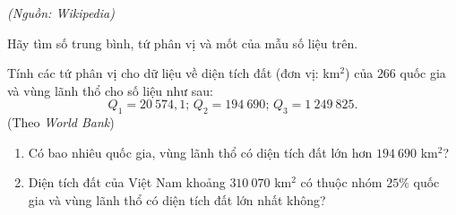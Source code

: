 \begin{bt}
\begin{center}
\begin{tabular}{|c|c|c|c|c|c|c|c|c|c|}
			\hline
		\end{tabular}
	\end{center}
	\begin{flushright}
		\textit{(Nguồn: Wikipedia)}
	\end{flushright}
Hãy tìm số trung bình, tứ phân vị và mốt của mẫu số liệu trên.
\end{bt}

\begin{bt}%
	Tính các tứ phân vị cho dữ liệu về diện tích đất (đơn vị: km$^2$) của $266$ quốc gia và vùng lãnh thổ cho số liệu như sau:
	\[ Q_1=20\ 574{,}1;\, Q_2=194\ 690;\, Q_3=1\ 249\ 825.\]
	\hfill (Theo \textit{World Bank})
	\begin{enumerate}
		\item Có bao nhiêu quốc gia, vùng lãnh thổ có diện tích đất lớn hơn $194\ 690$ km$^2$?
		\item Diện tích đất của Việt Nam khoảng $310\ 070$ km$^2$ có thuộc nhóm $25\%$ quốc gia và vùng lãnh thổ có diện tích đất lớn nhất không?
	\end{enumerate}
\end{bt}

